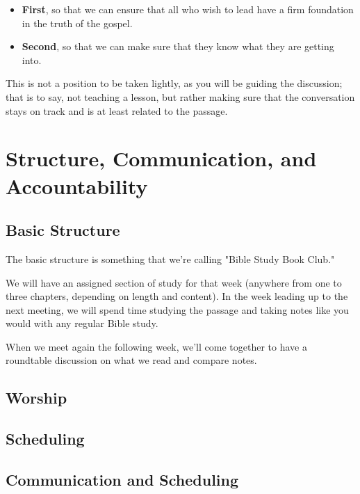 \documentclass[12pt]{article}
\begin{document}
\begin{itemize}

	\item \textbf{First}, so that we can ensure that all who wish to lead
	have a firm foundation in the truth of the gospel.

	\item \textbf{Second}, so that we can make sure that they know what they
	are getting into.

\end{itemize}

  This is not a position to be taken lightly, as you will be guiding the
discussion; that is to say, not teaching a lesson, but rather making sure that
the conversation stays on track and is at least related to the passage.

\section{Structure, Communication, and Accountability}

\subsection{Basic Structure}

	The basic structure is something that we're calling "Bible Study Book Club."

	We will have an assigned section of study for that week (anywhere from one to
three chapters, depending on length and content). In the week leading up to the
next meeting, we will spend time studying the passage and taking notes like you
would with any regular Bible study.

	When we meet again the following week, we'll come together to have a roundtable
discussion on what we read and compare notes.

\subsection{Worship}

\subsection{Scheduling}

\subsection{Communication and Scheduling}
\end{document}
